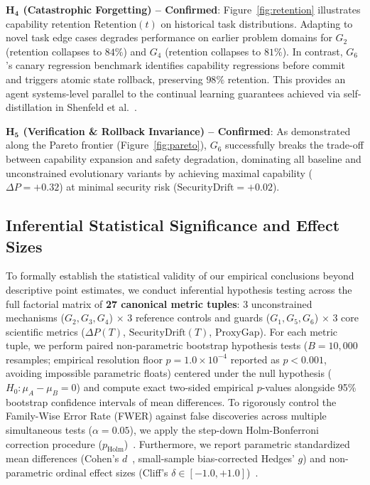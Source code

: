 \documentclass{article}
\begin{document}
\textbf{$\mathbf{H_4}$ (Catastrophic Forgetting) -- Confirmed}:
Figure~\ref{fig:retention} illustrates capability retention $\text{Retention}(t)$ on historical task distributions. Adapting to novel task edge cases degrades performance on earlier problem domains for $G_2$ (retention collapses to $84\%$) and $G_4$ (retention collapses to $81\%$). In contrast, $G_6$'s canary regression benchmark identifies capability regressions before commit and triggers atomic state rollback, preserving $98\%$ retention. This provides an agent systems-level parallel to the continual learning guarantees achieved via self-distillation in Shenfeld et al.~\cite{shenfeld2026selfdistill}.

\textbf{$\mathbf{H_5}$ (Verification \& Rollback Invariance) -- Confirmed}:
As demonstrated along the Pareto frontier (Figure~\ref{fig:pareto}), $G_6$ successfully breaks the trade-off between capability expansion and safety degradation, dominating all baseline and unconstrained evolutionary variants by achieving maximal capability ($\Delta P = +0.32$) at minimal security risk ($\text{SecurityDrift} = +0.02$).

\subsection{Inferential Statistical Significance and Effect Sizes}
\label{sec:stats_significance}

To formally establish the statistical validity of our empirical conclusions beyond descriptive point estimates, we conduct inferential hypothesis testing across the full factorial matrix of \textbf{27 canonical metric tuples}: 3 unconstrained mechanisms ($G_2, G_3, G_4$) $\times$ 3 reference controls and guards ($G_1, G_5, G_6$) $\times$ 3 core scientific metrics ($\Delta P(T)$, $\text{SecurityDrift}(T)$, $\text{ProxyGap}$). For each metric tuple, we perform paired non-parametric bootstrap hypothesis tests ($B = 10{,}000$ resamples; empirical resolution floor $p = 1.0 \times 10^{-4}$ reported as $p < 0.001$, avoiding impossible parametric floats) centered under the null hypothesis ($H_0: \mu_A - \mu_B = 0$) and compute exact two-sided empirical $p$-values alongside 95\% bootstrap confidence intervals of mean differences. To rigorously control the Family-Wise Error Rate (FWER) against false discoveries across multiple simultaneous tests ($\alpha = 0.05$), we apply the step-down Holm-Bonferroni correction procedure ($p_{\text{Holm}}$)~\cite{holm1979simple}. Furthermore, we report parametric standardized mean differences (Cohen's $d$~\cite{cohen1988statistical}, small-sample bias-corrected Hedges' $g$) and non-parametric ordinal effect sizes (Cliff's $\delta \in [-1.0, +1.0]$)~\cite{cliffs1993dominance}.
\end{document}
